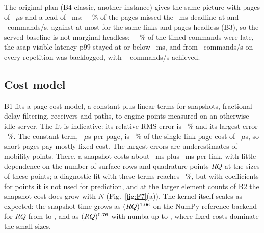 The original plan (B4-classic, another instance) gives the same picture with pages of
\numBfourClassicPageUs~$\mu$s and a lead of \numBfourLeadMinMs~ms:
\numBfourClassicMissMinPct--\numBfourClassicMissMaxPct~\% of the pages missed the
\numSustainSlackMs~ms deadline at \numBfourRateLowHz{} and \numBfourRateMidHz~commands/s,
against at most \numBthreeClassicRefMiss{} for the same links and pages headless (B3), so the
served baseline is not marginal headless; \numBfourClassicLateMinPct--\numBfourClassicLateMaxPct~\%
of the timed commands were late, the asap visible-latency p99 stayed at or below
\numBfourClassicVisPninetynineMaxMs~ms, and from \numBfourRateHighHz~commands/s on every
repetition was backlogged, with \numBfourClassicAchievedMin--\numBfourClassicAchievedMax{}
commands/s achieved.

\subsection{Cost model}
B1 fits a page cost model, a constant plus linear terms
for snapshots, fractional-delay filtering, receivers and paths, to \numBonePoints{} engine
points measured on an otherwise idle server. The fit is indicative: its relative RMS error
is \numBoneRelRmsPct~\% and its largest error \numBoneRelMaxPct~\%. The constant term,
\numBoneFixedUs~$\mu$s per page, is \numBoneFixedSharePct~\% of the single-link page cost of
\numBoneBasePageUs~$\mu$s, so short pages pay mostly fixed cost. The largest errors are
underestimates of mobility points. There, a snapshot costs about \numBoneSnapMs~ms plus
\numBoneSnapLinkMs~ms per link, with little dependence on the number of surface rows and
quadrature points $RQ$ at the sizes of these points; a diagnostic fit with these terms reaches
\numBoneExtRelRmsPct~\%, but with \numBoneExtCoeffs{} coefficients for \numBonePoints{} points it
is not used for prediction, and at the larger element counts of B2 the snapshot cost does grow
with $N$ (Fig.~\ref{fig:F7}(a)).
The kernel itself scales as expected: the snapshot time grows as
$(RQ)^{1.06}$ on the NumPy reference backend for $RQ$ from \numBoneRqMin{} to
\numBoneRqMax, and as $(RQ)^{0.76}$ with numba up to \numBoneRqMaxNumba, where
fixed costs dominate the small sizes.

